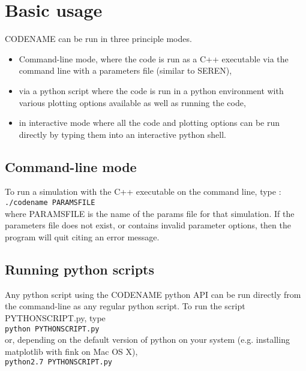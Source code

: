 \documentclass[a4paper]{article}
\newcommand{\var}[1]{\texttt{#1}}
\begin{document}
\section{Basic usage}
CODENAME can be run in three principle modes.  
\begin{itemize} 
\item Command-line mode, where the code is run as a C++ executable via the command line with a parameters file (similar to SEREN), 
\item via a python script where the code is run in a python environment with various plotting options available as well as running the code, 
\item in interactive mode where all the code and plotting options can be run directly by typing them into an interactive python shell.
\end{itemize}



\subsection{Command-line mode}

\noindent To run a simulation with the C++ executable on the command line, type : \\
\newline
\var{./codename PARAMSFILE} \\
\newline
where PARAMSFILE is the name of the params file for that simulation.  If the parameters file does not exist, or contains invalid parameter options, then the program will quit citing an error message.


\subsection{Running python scripts}


\noindent Any python script using the CODENAME python API can be run directly from the command-line as any regular python script.  To run the script PYTHONSCRIPT.py, type \\
\newline
\var{python PYTHONSCRIPT.py} \\
\newline
or, depending on the default version of python on your system (e.g. installing matplotlib with fink on Mac OS X), \\
\newline
\var{python2.7 PYTHONSCRIPT.py} \\
\newline
\end{document}
